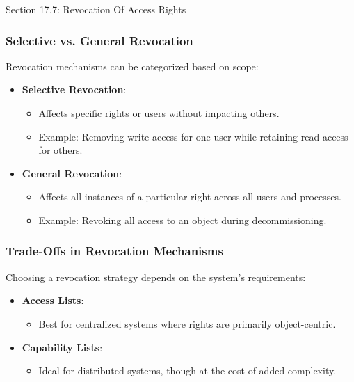 \begin{notes}{Section 17.7: Revocation Of Access Rights}
    \subsubsection*{Selective vs. General Revocation}
    
    Revocation mechanisms can be categorized based on scope:
    \begin{itemize}
        \item \textbf{Selective Revocation}:
        \begin{itemize}
            \item Affects specific rights or users without impacting others.
            \item Example: Removing write access for one user while retaining read access for others.
        \end{itemize}
        \item \textbf{General Revocation}:
        \begin{itemize}
            \item Affects all instances of a particular right across all users and processes.
            \item Example: Revoking all access to an object during decommissioning.
        \end{itemize}
    \end{itemize}
    
    \subsubsection*{Trade-Offs in Revocation Mechanisms}
    
    Choosing a revocation strategy depends on the system's requirements:
    \begin{itemize}
        \item \textbf{Access Lists}:
        \begin{itemize}
            \item Best for centralized systems where rights are primarily object-centric.
        \end{itemize}
        \item \textbf{Capability Lists}:
        \begin{itemize}
            \item Ideal for distributed systems, though at the cost of added complexity.
        \end{itemize}
    \end{itemize}
    

\end{notes}
